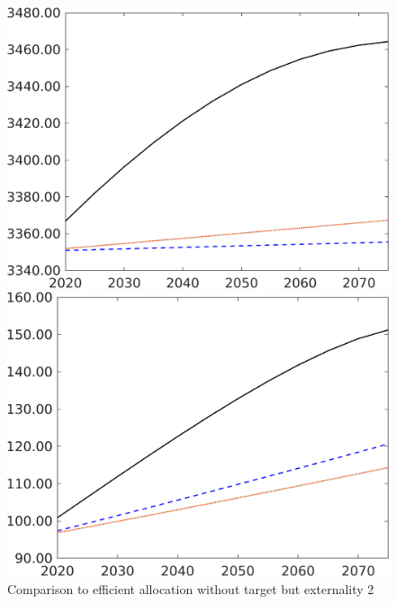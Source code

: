 \begin{figure}[h!!]
	\centering
	\caption{Comparison to efficient allocation without target but externality 2}\label{fig:Compno_eff_Growth}
	\begin{minipage}[]{0.32\textwidth}
		\includegraphics[width=1\textwidth]{../../codding_model/own_basedOnFried/optimalPol_elastS_DisuSci/figures/all_1705/Extern_CompEff_Af_spillover0_noskill0_sep1_BN0_ineq0_red0_etaa0.79_lgd0.png}
	\end{minipage}
	\begin{minipage}[]{0.32\textwidth}
		\includegraphics[width=1\textwidth]{../../codding_model/own_basedOnFried/optimalPol_elastS_DisuSci/figures/all_1705/Extern_CompEff_Ag_spillover0_noskill0_sep1_BN0_ineq0_red0_etaa0.79_lgd0.png}

\end{minipage}
\end{figure}
